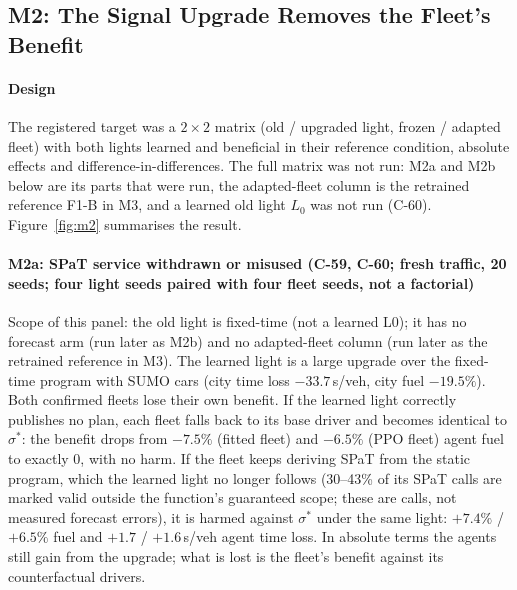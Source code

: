 \subsection{M2: The Signal Upgrade Removes the Fleet's Benefit}\label{sec:m2}
\paragraph{Design} The registered target was a $2\times2$ matrix (old / upgraded light, frozen / adapted fleet) with both lights learned and
beneficial in their reference condition, absolute effects and difference-in-differences. The full matrix was not run: M2a and M2b below are
its parts that were run, the adapted-fleet column is the retrained reference F1-B in M3, and a learned old light $L_0$ was not run (C-60).
Figure~\ref{fig:m2} summarises the result.
\paragraph{M2a: SPaT service withdrawn or misused (C-59, C-60; fresh traffic, 20 seeds; four light seeds paired with four fleet
seeds, not a factorial)} Scope of this panel: the old light is fixed-time (not a learned L0); it has no forecast arm (run later as M2b)
and no adapted-fleet column (run later as the retrained reference in M3). The learned light is a large
upgrade over the fixed-time program with SUMO cars (city time loss $-33.7$\,s/veh, city fuel $-19.5\%$). Both confirmed fleets lose their
own benefit. If the learned light correctly publishes no plan, each fleet falls back to its base driver and becomes identical to
$\sigma^*$: the benefit drops from $-7.5\%$ (fitted fleet) and $-6.5\%$ (PPO fleet) agent fuel to exactly 0, with no harm. If the fleet
keeps deriving SPaT from the static program, which the learned light no longer follows (30--43\% of its SPaT calls are marked valid
outside the function's guaranteed scope; these are calls, not measured forecast errors), it is harmed against $\sigma^*$ under the same light: $+7.4\%$ / $+6.5\%$ fuel and $+1.7$ / $+1.6$\,s/veh agent time loss. In
absolute terms the agents still gain from the upgrade; what is lost is the fleet's benefit against its counterfactual drivers.
